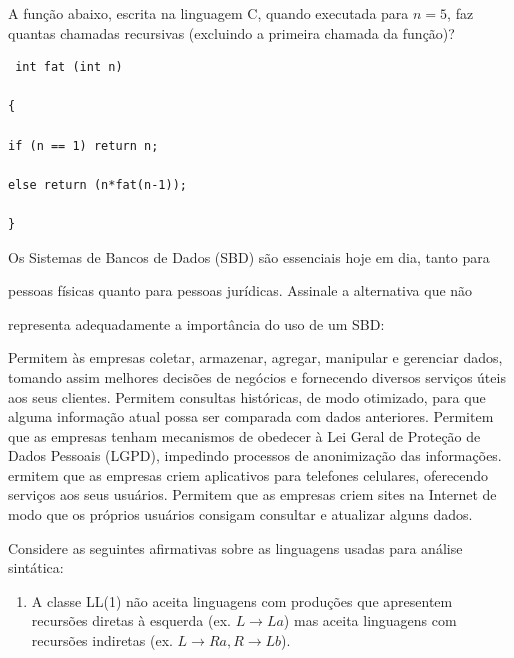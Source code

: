 \documentclass[12pt, addpoints]{exam}
\begin{document}
\begin{questions}
\question

A função abaixo, escrita na linguagem C, quando executada para \( n = 5 \), faz quantas chamadas recursivas (excluindo a primeira chamada da função)? 

\begin{verbatim} int fat (int n) 

{ 

if (n == 1) return n; 

else return (n*fat(n-1)); 

} 

\end{verbatim}
\begin{choices}
\end{choices}

\question

Os Sistemas de Bancos de Dados (SBD) são essenciais hoje em dia, tanto para

pessoas físicas quanto para pessoas jurídicas. Assinale a alternativa que não

representa adequadamente a importância do uso de um SBD:
\begin{choices}
\choice Permitem às empresas coletar, armazenar, agregar, manipular e gerenciar dados, tomando assim melhores decisões de negócios e fornecendo diversos serviços úteis aos seus clientes.
\choice Permitem consultas históricas, de modo otimizado, para que alguma informação atual possa ser comparada com dados anteriores.
\choice Permitem que as empresas tenham mecanismos de obedecer à Lei Geral de Proteção de Dados Pessoais (LGPD), impedindo processos de anonimização das informações.
\choice ermitem que as empresas criem aplicativos para telefones celulares, oferecendo serviços aos seus usuários.
\choice Permitem que as empresas criem sites na Internet de modo que os próprios usuários consigam consultar e atualizar alguns dados.
\end{choices}

\question

Considere as seguintes afirmativas sobre as linguagens usadas para análise sintática:

\begin{enumerate}[label=\Roman*.]

    \item A classe LL(1) não aceita linguagens com produções que apresentem recursões diretas à esquerda (ex. \(L \rightarrow La\)) mas aceita linguagens com recursões indiretas (ex. \(L \rightarrow Ra, R \rightarrow Lb\)).


\end{enumerate}
\end{questions}
\end{document}
